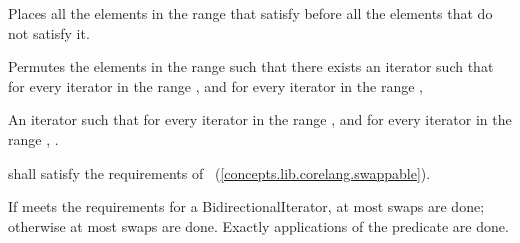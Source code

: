 \begin{itemdescr}
\pnum
\begin{removedblock}
\effects Places all the elements in the range  that satisfy
 before all the elements that do not satisfy it.
\end{removedblock}

\begin{addedblock}
\effects Permutes the elements in the range  such that there exists an iterator 
such that for every iterator  in the range 
, and for every iterator  in the
range , 
\end{addedblock}

\pnum
\returns An iterator  such that for every iterator  in the range 
,
and for every iterator  in the range ,
.

\begin{removedblock}
\pnum
\requires
{} shall satisfy the requirements of
~(\ref{concepts.lib.corelang.swappable}).
\end{removedblock}

\pnum
\complexity If  meets the requirements for a BidirectionalIterator, at most
 swaps are done; otherwise at most  swaps
are done. Exactly  applications of the predicate are done.
\end{itemdescr}

